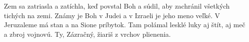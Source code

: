 Zem sa zatriasla a zatíchla,
keď povstal Boh a súdil,
aby zachránil všetkých tichých na zemi.
\versseparator
Známy je Boh v Judei
a v Izraeli je jeho meno veľké.
\versseparator
V Jeruzaleme má stan
a na Sione príbytok.
\versseparator
Tam polámal lesklé luky
aj štít, aj meč a zbroj vojnovú.
Ty, Zázračný, žiariš
z vrchov plienenia.